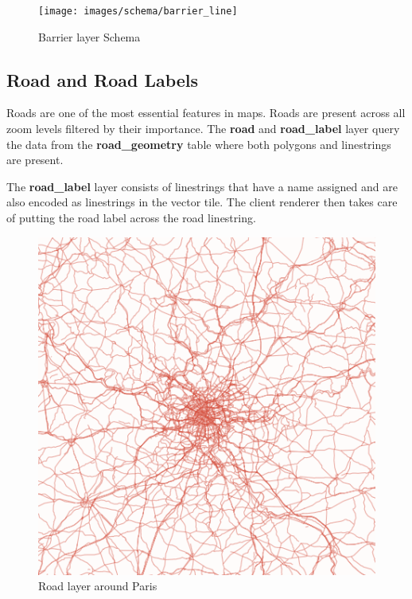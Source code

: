 \begin{figure}[H]
  \centering
  \texttt{[image: images/schema/barrier\_line]}
  \caption{Barrier layer Schema}
\end{figure}

\subsection{Road and Road Labels}

\noindent\begin{minipage}[t]{0.48\linewidth}
    \vspace{0pt}
    Roads are one of the most essential features in maps. Roads are present across all zoom levels filtered by their importance. The \textbf{road} and \textbf{road\_label} layer query the data from the \textbf{road\_geometry} table where both polygons and linestrings are present.
    
    The \textbf{road\_label} layer consists of linestrings that have a name assigned and are also encoded as linestrings in the vector tile. The client renderer then takes care of putting the road label across the road linestring.
\end{minipage}
\hfill
\begin{minipage}[t]{0.48\linewidth}
    \begin{figure}[H]
      \includegraphics[width=1\textwidth]{images/schema/road_example}
      \caption{Road layer around Paris}
    \end{figure}
\end{minipage}

